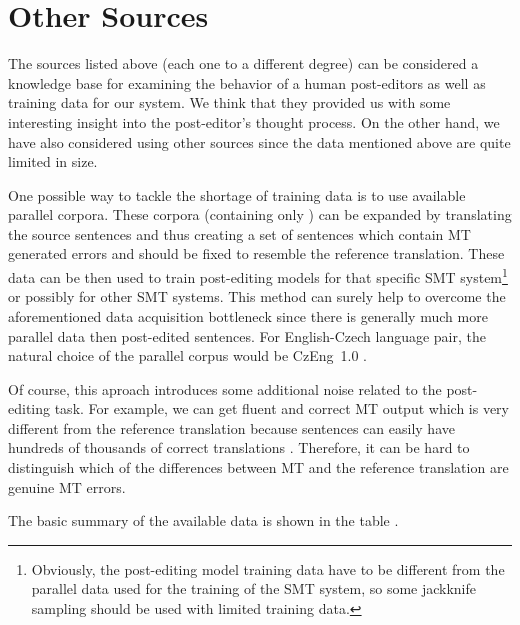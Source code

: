 \section{Other Sources}

The sources listed above (each one to a different degree) can
be considered a knowledge base for examining the behavior of a human post-editors as well
as training data for our system. We think that they provided us with
some interesting insight into the post-editor's thought process. On the other hand,
we have also considered using other sources since the data mentioned above are quite
limited in size.

One possible way to tackle the shortage of training data is to use available parallel corpora.
These corpora (containing only )
can be expanded by translating the source sentences and thus creating a set of 
sentences which contain MT generated errors and should be fixed to resemble the 
reference translation. These data can be then used to train post-editing models for that
specific SMT system\footnote{Obviously, the post-editing model training data have to be
different from the parallel data used for the training of the SMT system, so
some
jackknife sampling should be used with limited training data.} or possibly for
other SMT systems.
This method can surely help to overcome the aforementioned data acquisition bottleneck
since there is generally much more parallel data then post-edited sentences. For
English-Czech language pair, the natural choice of the parallel corpus would be
CzEng~1.0 \citep{czeng10:lrec2012}.


Of course, this aproach introduces some additional noise
related to the post-editing task. For example, we can get fluent and correct MT output which
is very different from the reference translation
because sentences can easily have hundreds of thousands of correct translations \citep{biblio8445677574576847760}.
Therefore, it can be hard to distinguish which of the differences between
MT and the reference translation are genuine MT errors.

The basic summary of the available data is shown in the table .

